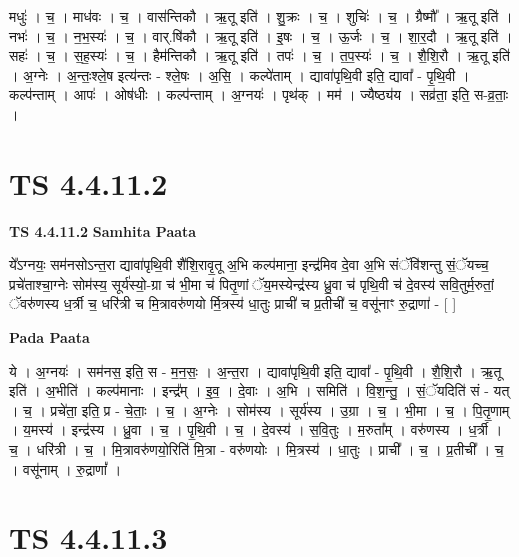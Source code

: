 \documentclass[17pt]{extarticle}
\begin{document}
मधुः॑ । च॒ । माध॑वः । च॒ । वास॑न्तिकौ । ऋ॒तू इति॑ । शु॒क्रः । च॒ । शुचिः॑ । च॒ । ग्रैष्मौ᳚ । ऋ॒तू इति॑ । नभः॑ । च॒ । न॒भ॒स्यः॑ । च॒ । वार्.षि॑कौ । ऋ॒तू इति॑ । इ॒षः । च॒ । ऊ॒र्जः । च॒ । शा॒र॒दौ । ऋ॒तू इति॑ । सहः॑ । च॒ । स॒ह॒स्यः॑ । च॒ । हैम॑न्तिकौ । ऋ॒तू इति॑ । तपः॑ । च॒ । त॒प॒स्यः॑ । च॒ । शै॒शि॒रौ । ऋ॒तू इति॑ । अ॒ग्नेः । अ॒न्तः॒श्ले॒ष इत्य॑न्तः - श्ले॒षः । अ॒सि॒ । कल्पे॑ताम् । द्यावा॑पृथि॒वी इति॒ द्यावा᳚ - पृ॒थि॒वी । कल्प॑न्ताम् । आपः॑ । ओष॑धीः । कल्प॑न्ताम् । अ॒ग्नयः॑ । पृथ॑क् । मम॑ । ज्यैष्ठ्य॑य । सव्र॑ता॒ इति॒ स-व्र॒ताः॒ ।  \newline




\section*{ TS 4.4.11.2 }

\textbf{TS 4.4.11.2 } \newline
\textbf{Samhita Paata} \newline

ये᳚ऽग्नयः॒ सम॑नसोऽन्त॒रा द्यावा॑पृथि॒वी शै॑शि॒रावृ॒तू अ॒भि कल्प॑माना॒ इन्द्र॑मिव दे॒वा अ॒भि संॅवि॑शन्तु सं॒ॅयच्च॒ प्रचे॑ताश्चा॒ग्नेः सोम॑स्य॒ सूर्य॑स्यो॒-ग्रा च॑ भी॒मा च॑ पितृ॒णां ॅय॒मस्येन्द्र॑स्य ध्रु॒वा च॑ पृथि॒वी च॑ दे॒वस्य॑ सवि॒तुर्म॒रुतां॒ ॅवरु॑णस्य ध॒र्त्री च॒ धरि॑त्री च मि॒त्रावरु॑णयो र्मि॒त्रस्य॑ धा॒तुः प्राची॑ च प्र॒तीची॑ च॒ वसू॑नाꣳ रु॒द्राणा॑ - [  ] \newline

\textbf{Pada Paata} \newline

ये । अ॒ग्नयः॑ । सम॑नस॒ इति॒ स - म॒न॒सः॒ । अ॒न्त॒रा । द्यावा॑पृथि॒वी इति॒ द्यावा᳚ - पृ॒थि॒वी । शै॒शि॒रौ । ऋ॒तू इति॑ । अ॒भीति॑ । कल्प॑मानाः । इन्द्र᳚म् । इ॒व॒ । दे॒वाः । अ॒भि । समिति॑ । वि॒श॒न्तु॒ । सं॒ॅयदिति॑ सं - यत् । च॒ । प्रचे॑ता॒ इति॒ प्र - चे॒ताः॒ । च॒ । अ॒ग्नेः । सोम॑स्य । सूर्य॑स्य । उ॒ग्रा । च॒ । भी॒मा । च॒ । पि॒तृ॒णाम् । य॒मस्य॑ । इन्द्र॑स्य । ध्रु॒वा । च॒ । पृ॒थि॒वी । च॒ । दे॒वस्य॑ । स॒वि॒तुः । म॒रुता᳚म् । वरु॑णस्य । ध॒र्त्री । च॒ । धरि॑त्री । च॒ । मि॒त्रावरु॑णयो॒रिति॑ मि॒त्रा - वरु॑णयोः । मि॒त्रस्य॑ । धा॒तुः । प्राची᳚ । च॒ । प्र॒तीची᳚ । च॒ । वसू॑नाम् । रु॒द्राणां᳚ ।  \newline




\section*{ TS 4.4.11.3 }
\end{document}
